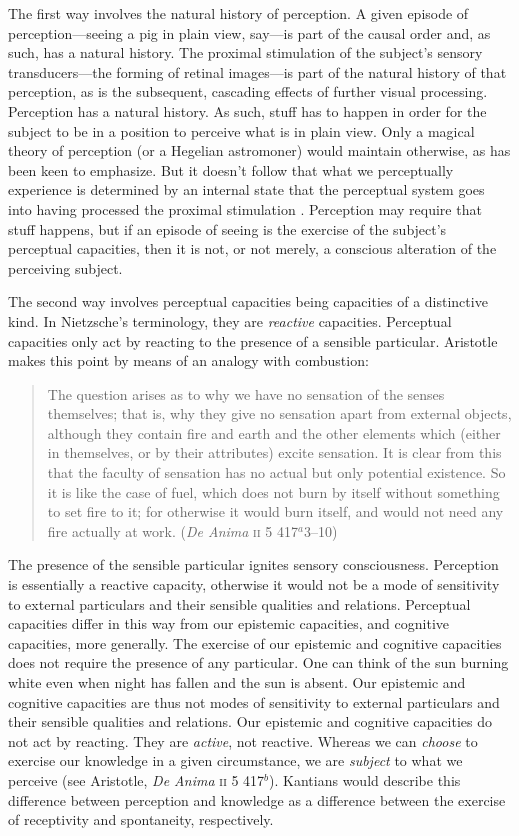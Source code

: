 \documentclass[12pt]{article}
\begin{document}
The first way involves the natural history of perception. A given episode of perception---seeing a pig in plain view, say---is part of the causal order and, as such, has a natural history. The proximal stimulation of the subject's sensory transducers---the forming of retinal images---is part of the natural history of that perception, as is the subsequent, cascading effects of further visual processing. Perception has a natural history. As such, stuff has to happen in order for the subject to be in a position to perceive what is in plain view. Only a magical theory of perception (or a Hegelian astromoner) would maintain otherwise, as \citet[]{Burge:2005uq} has been keen to emphasize. But it doesn't follow that what we perceptually experience is determined by an internal state that the perceptual system goes into having processed the proximal stimulation \citep[see][]{Campbell:2010uq,McDowell:2010fk,Travis:2011os}. Perception may require that stuff happens, but if an episode of seeing is the exercise of the subject's perceptual capacities, then it is not, or not merely, a conscious alteration of the perceiving subject.

The second way involves perceptual capacities being capacities of a distinctive kind. In Nietzsche's \citeyearpar{Nietzsche1887On-the-Genealog} terminology, they are \emph{reactive} capacities. Perceptual capacities only act by reacting to the presence of a sensible particular. Aristotle makes this point by means of an analogy with combustion:
\begin{quote}
	The question arises as to why we have no sensation of the senses themselves; that is, why they give no sensation apart from external objects, although they contain fire and earth and the other elements which (either in themselves, or by their attributes) excite sensation. It is clear from this that the faculty of sensation has no actual but only potential existence. So it is like the case of fuel, which does not burn by itself without something to set fire to it; for otherwise it would burn itself, and would not need any fire actually at work. (\emph{De Anima} \textsc{ii} 5 417\( ^{a} \)3--10)
\end{quote}
The presence of the sensible particular ignites sensory consciousness. Perception is essentially a reactive capacity, otherwise it would not be a mode of sensitivity to external particulars and their sensible qualities and relations. Perceptual capacities differ in this way from our epistemic capacities, and cognitive capacities, more generally. The exercise of our epistemic and cognitive capacities does not require the presence of any particular. One can think of the sun burning white even when night has fallen and the sun is absent. Our epistemic and cognitive capacities are thus not modes of sensitivity to external particulars and their sensible qualities and relations. Our epistemic and cognitive capacities do not act by reacting. They are \emph{active}, not reactive. Whereas we can \emph{choose} to exercise our knowledge in a given circumstance, we are \emph{subject} to what we perceive (see Aristotle, \emph{De Anima} \textsc{ii} 5 417\( ^{b} \)). Kantians would describe this difference between perception and knowledge as a difference between the exercise of receptivity and spontaneity, respectively. 
\end{document}
